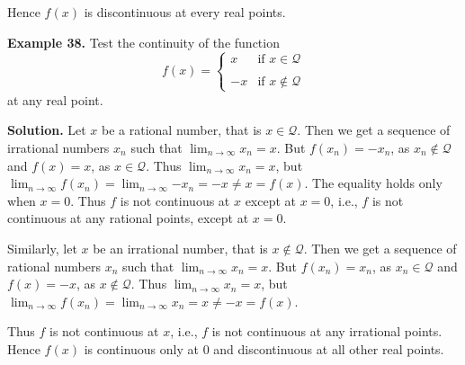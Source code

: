 \documentclass[../../main.tex]{subfiles}
\begin{document}
Hence $f(x)$ is discontinuous at every real points.

\vspace{0.2cm}
\textbf{Example 38.}
\vspace{0.2cm}
Test the continuity of the function 
\begin{equation*}
    f(x) =
\begin{cases}
    x     & \text{if    }      x \in \mathcal{Q} \\\\
    -x   & \text{if    }        x \notin \mathcal{Q}
\end{cases}
\end{equation*}
at any real point.

\textbf{Solution.} Let $x$ be a rational number, that is $x\in \mathcal{Q}$. Then we get a sequence of irrational numbers ${x_n}$ such that $\lim_{n\rightarrow \infty} {x_n} = x$. But $f({x_n})= -x_n$, as ${x_n}\notin \mathcal{Q}$ and $f(x)=x$, as $x\in \mathcal{Q}$. Thus $\lim_{n\rightarrow \infty} {x_n} = x$, but $\lim_{n\rightarrow \infty} {f(x_n)}=\lim_{n\rightarrow \infty} {-x_n}=-x \neq x = f(x)$. The equality holds only when $x=0$. Thus $f$ is not continuous at $x$ except at $x=0$, i.e., $f$ is not continuous at any rational points, except at $x=0$.

Similarly, let $x$ be an irrational number, that is $x\notin \mathcal{Q}$. Then we get a sequence of rational numbers ${x_n}$ such that $\lim_{n\rightarrow \infty}{x_n} = x$. But $f({x_n})= x_n$, as ${x_n}\in \mathcal{Q}$ and $f(x)=-x$, as $x\notin \mathcal{Q}$. Thus $\lim_{n\rightarrow \infty}{x_n} = x$, but $\lim_{n\rightarrow \infty} {f(x_n)}=\lim_{n\rightarrow \infty} {x_n} = x \neq -x =f(x)$. 

Thus $f$ is not continuous at $x$, i.e., $f$ is not continuous at any irrational points. Hence $f(x)$ is continuous only at $0$ and discontinuous at all other real points.
     
\end{document}
